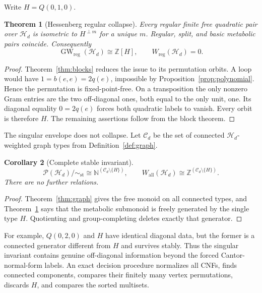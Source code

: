 \documentclass[11pt]{article}
\newtheorem{theorem}{Theorem}[section]
\newtheorem{corollary}[theorem]{Corollary}
\theoremstyle{definition}
\theoremstyle{remark}
\newcommand{\Nat}{\mathbb N}
\newcommand{\Integers}{\mathbb Z}
\newcommand{\Hess}{\mathcal H}
\newcommand{\Pair}{\mathcal P}
\newcommand{\Connected}{\mathcal C}
\begin{document}
Write \(H=Q(0,1,0)\).

\begin{theorem}[Hessenberg regular collapse]\label{thm:hesscollapse}
Every regular finite free quadratic pair over \(\Hess_d\) is isometric to
\(H^{\perp m}\) for a unique \(m\).  Regular, split, and basic metabolic pairs
coincide.  Consequently
\[
 \operatorname{GW}_{\mathrm{reg}}(\Hess_d)\cong\Integers[H],
 \qquad W_{\mathrm{reg}}(\Hess_d)=0.
\]
\end{theorem}

\begin{proof}
Theorem~\ref{thm:blocks} reduces the issue to its permutation orbits.  A loop
would have \(1=b(e,e)=2q(e)\), impossible by
Proposition~\ref{prop:polynomial}.  Hence the permutation is fixed-point-free.
On a transposition the only nonzero Gram entries are the two off-diagonal
ones, both equal to the only unit, one.  Its diagonal equality
\(0=2q(e)\) forces both quadratic labels to vanish.  Every orbit is therefore
\(H\).  The remaining assertions follow from the block theorem.
\end{proof}

The singular envelope does not collapse.  Let \(\Connected_d\) be the set of
connected \(\Hess_d\)-weighted graph types from
Definition~\ref{def:graph}.

\begin{corollary}[Complete stable invariant]\label{cor:hessstable}
\[
 \Pair(\Hess_d)/{\sim_{\mathrm{st}}}
 \cong\Nat^{(\Connected_d\setminus\{H\})},
 \qquad
 W_{\mathrm{all}}(\Hess_d)
 \cong\Integers^{(\Connected_d\setminus\{H\})}.
\]
There are no further relations.
\end{corollary}

\begin{proof}
Theorem~\ref{thm:graph} gives the free monoid on all connected types, and
Theorem~\ref{thm:hesscollapse} says that the metabolic submonoid is freely
generated by the single type \(H\).  Quotienting and group-completing deletes
exactly that generator.
\end{proof}

For example, \(Q(0,2,0)\) and \(H\) have identical diagonal data, but the
former is a connected generator different from \(H\) and survives stably.
Thus the singular invariant contains genuine off-diagonal information beyond
the forced Cantor-normal-form labels.  An exact decision procedure normalizes
all CNFs, finds connected components, compares their finitely many vertex
permutations, discards \(H\), and compares the sorted multisets.
\end{document}
